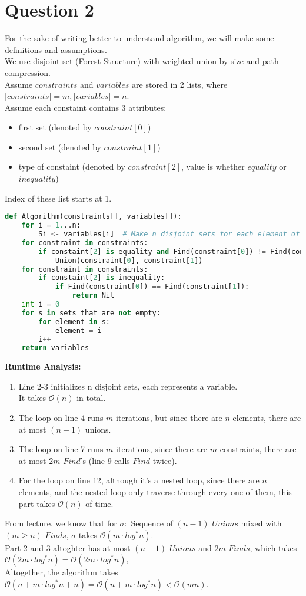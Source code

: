 \documentclass[10pt]{article}
\begin{document}
\newpage
\section*{Question 2}
For the sake of writing better-to-understand algorithm, we will make some definitions and assumptions.\\
We use disjoint set (Forest Structure) with weighted union by size and path compression.\\
Assume $constraints$ and $variables$ are stored in 2 lists, where $|constraints|=m, |variables|=n$.\\
Assume each constaint contains 3 attributes: 
\begin{itemize}
\item first set (denoted by $constraint[0]$)
\item second set (denoted by $constraint[1]$)
\item type of constaint (denoted by $constraint[2]$, value is whether $equality$ or $inequality$)
\end{itemize}
Index of these list starts at 1.
\begin{lstlisting}[language=Python]
def Algorithm(constraints[], variables[]):
	for i = 1...n:
		Si <- variables[i]	# Make n disjoint sets for each element of variables named S1...Sn
	for constraint in constraints:
		if constaint[2] is equality and Find(constraint[0]) != Find(constraint[1]):
			Union(constraint[0], constraint[1])
	for constraint in constraints:
		if constaint[2] is inequality:
			if Find(constraint[0]) == Find(constraint[1]):
				return Nil
	int i = 0
	for s in sets that are not empty:
		for element in s:
			element = i		
		i++
	return variables
\end{lstlisting}
\textbf{Runtime Analysis:}
\begin{enumerate}
\item Line 2-3 initializes n disjoint sets, each represents a variable.\\
It takes $\mathcal{O}(n)$ in total.
\item The loop on line 4 runs $m$ iterations, but since there are $n$ elements, there are at most $(n-1)$ unions.
\item The loop on line 7 runs $m$ iterations, since there are $m$ constraints, there are at most $2m$ $Find$'s (line 9 calls $Find$ twice).
\item For the loop on line 12, although it's a nested loop, since there are $n$ elements, and the nested loop only traverse through every one of them, this part takes $\mathcal{O}(n)$ of time.
\end{enumerate}
From lecture, we know that for $\sigma:$ Sequence of $(n-1)$ $Unions$ mixed with $(m\geq n)$ $Finds$, $\sigma$ takes $\mathcal{O}(m\cdot log^*n)$.\\
Part 2 and 3 altoghter has at most $(n-1)$ $Unions$ and $2m$ $Finds$, which takes $\mathcal{O}(2m\cdot log^*n)=\mathcal{O}(2m\cdot log^*n)$,\\
Altogether, the algorithm takes $\mathcal{O}(n+m\cdot log^*n + n)=\mathcal{O}(n+m\cdot log^*n)<\mathcal{O}(mn)$.
\end{document}
